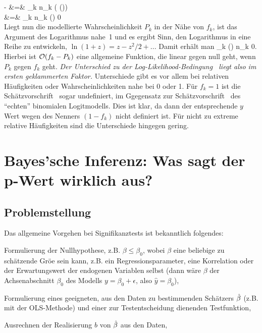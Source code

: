 \bdma
- 
 &=& \sum_k n_k \ablpart{}{\vecbeta}
\left( \ln \left(\right)\right) \\
 &=& \sum_k n_k \ln \left(\right)
  \stackrel{!}{=} 0\\
\edma
Liegt nun die modellierte Wahrscheinlichkeit $P_k$ in der N\"ahe von
$f_k$, ist das Argument des Logarithmus nahe~1  und es ergibt Sinn, den Logarithmus in eine Reihe zu entwickeln,
$\ln(1+z)=z-z^2/2 + ...$ 
Damit erh\"alt man
\be
\label{logR:min}
\sum_k \left(\right) 
n_k  \stackrel{!}{=} 0.
\ee
Hierbei ist ${\cal O}(f_k-P_k)$ eine allgemeine Funktion, die linear gegen
null geht, wenn $P_k$ gegen $f_k$ geht. \emph{Der Unterschied zu der
Log-Likelihood-Bedingung~ liegt also im
ersten geklammerten Faktor.}  Unterschiede gibt es vor allem bei
relativen H\"aufigkeiten oder Wahrscheinlichkeiten nahe bei 0 oder 1. F\"ur
$f_k=1$ ist die Sch\"atzvorschrift~ sogar undefiniert,
im Ggegensatz zur Sch\"atzvorschrift~ des
``echten'' binomialen Logitmodells. Dies ist klar, da dann der
entsprechende $y$ Wert wegen des Nenners $(1-f_k)$ nicht definiert
ist. F\"ur nicht zu extreme relative
H\"aufigkeiten sind die Unterschiede hingegen gering.





\section{\label{sec:bayes}Bayes'sche Inferenz: Was sagt der p-Wert wirklich aus?}



\subsection{Problemstellung}

Das allgemeine Vorgehen bei Signifikanztests ist bekanntlich
folgendes:
\benum
\item Formulierung der Nullhypothese, z.B. $\beta\le \beta_0$, wobei
  $\beta$ eine beliebige zu sch\"atzende Gr\"o\3e sein kann, z.B. ein
  Regressionsparameter, eine Korrelation oder der Erwartungswert der
  endogenen Variablen selbst (dann w\"are $\beta$ der
  Achsenabschnitt $\beta_0$ des Modells $y=\beta_0+\epsilon$, also $\hat{y}=\beta_0$),
\item Formulierung eines geeigneten, aus den Daten zu bestimmenden
  Sch\"atzers $\hat{\beta}$ (z.B. mit der OLS-Methode) 
und einer zur Testentscheidung dienenden Testfunktion,
\item Ausrechnen der Realisierung $b$ von $\hat{\beta}$ aus den Daten,
  
